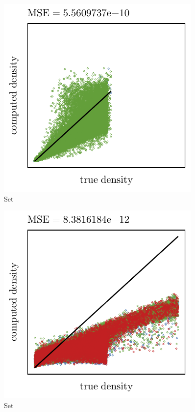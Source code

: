 \begin{subfigure}{0.3\textwidth}
	\centering
	\includegraphics[keepaspectratio=true, width=\textwidth, height=0.23\textheight]{4/img/results_ferdosi_4_60000_sambe_breiman.pdf}
	\caption{Set \ferdosiFour}
	\label{fig:4:simulated:datasets:sambe:ferdosi4}
\end{subfigure}
\begin{subfigure}{0.3\textwidth}
	\centering
	\includegraphics[keepaspectratio=true, width=\textwidth, height=0.23\textheight]{4/img/results_ferdosi_5_60000_sambe_breiman.pdf}
	\caption{Set \ferdosiFive}
	\label{fig:4:simulated:datasets:sambe:ferdosi5}
\end{subfigure}	